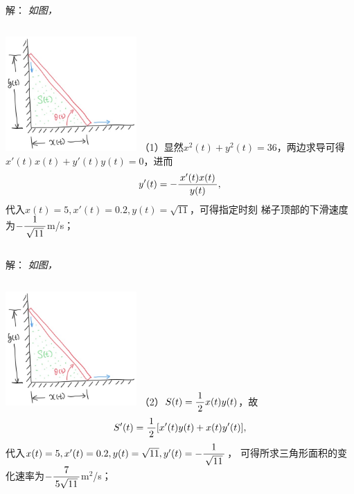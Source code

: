 \begin{frame}
	\linespread{1.5}
\end{frame}

\begin{frame}
	\linespread{1.5}
	\small 解：\it
	如图，
	\begin{columns}
		\includegraphics[width=5cm]{./images/ch2/ladder.jpg}
		\pause （1）显然$x^2(t)+y^2(t)=36$，两边求导可得
		$x'(t)x(t)+y'(t)y(t)=0$，进而
		$$y'(t)=-\displaystyle\frac{\,{x'(t)x(t)}\,}{\,{y(t)}\,},$$
		\pause 代入$x(t)=5,x'(t)=0.2,y(t)=\sqrt{11}$，可得指定时刻
		梯子顶部的下滑速度为$-\displaystyle\frac{\,{1}\,}{\,{\sqrt{11}}\,}$m/s；
	\end{columns}
\end{frame}

\begin{frame}
	\linespread{1.5}
	\small 解：\it
	如图，
	\begin{columns}
		\column{0.4\textwidth}
		\includegraphics[width=5cm]{./images/ch2/ladder.jpg}
		\column{0.6\textwidth}
		（2）$S(t)=\displaystyle\frac{\,{1}\,}{\,{2}\,}x(t)y(t)$，故
		$$S'(t)=\displaystyle\frac{\,{1}\,}{\,{2}\,}[x'(t)y(t)+x(t)y'(t)],$$
		\pause 代入$x(t)=5,x'(t)=0.2,y(t)=\sqrt{11},y'(t)=-\displaystyle\frac{\,{1}\,}{\,{\sqrt{11}}\,}$，
		可得所求三角形面积的变化速率为$-\displaystyle\frac{\,{7}\,}{\,{5\sqrt{11}}\,}$m$^2$/s；
	\end{columns}
\end{frame}

